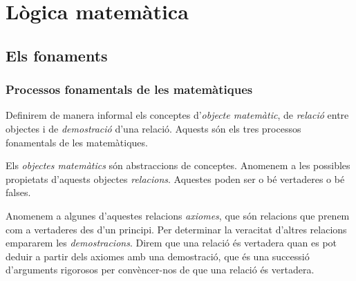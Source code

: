 \documentclass[../Apunts.tex]{subfiles}
\begin{document}
	\chapter{Lògica matemàtica}
	\section{Els fonaments}
	\subsection{Processos fonamentals de les matemàtiques}
	Definirem de manera informal els conceptes d'\emph{objecte matemàtic}, de \emph{relació} entre objectes i de \emph{demostració} d'una relació. Aquests són els tres processos fonamentals de les matemàtiques.
	
	Els \emph{objectes matemàtics} són abstraccions de conceptes. Anomenem a les possibles propietats d'aquests objectes \emph{relacions}. Aquestes poden ser o bé vertaderes o bé falses.
	
	Anomenem a algunes d'aquestes relacions \emph{axiomes}, que són relacions que prenem com a vertaderes des d'un principi. Per determinar la veracitat d'altres relacions empararem les \emph{demostracions}. Direm que una relació és vertadera quan es pot deduir a partir dels axiomes amb una demostració, que és una successió d'arguments rigorosos per convèncer-nos de que una relació és vertadera.
\end{document}
